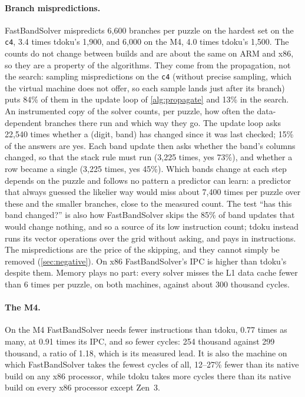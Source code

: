 \documentclass[11pt]{article}
\theoremstyle{definition}
\theoremstyle{plain}
\begin{document}
\paragraph{Branch mispredictions.} FastBandSolver mispredicts 6{,}600 branches per puzzle on the hardest set on the
\texttt{c4}, 3.4 times tdoku's 1{,}900, and 6{,}000 on the M4, 4.0 times tdoku's 1{,}500. The counts do not change
between builds and are about the same on ARM and x86, so they are a property of the algorithms. They come from the
propagation, not the search: sampling mispredictions on the \texttt{c4} (without precise sampling, which the virtual
machine does not offer, so each sample lands just after its branch) puts 84\% of them in the update loop of
\cref{alg:propagate} and 13\% in the search. An instrumented copy of the solver counts, per puzzle, how often the
data-dependent branches there run and which way they go. The update loop asks 22{,}540 times whether a (digit, band)
has changed since it was last checked; 15\% of the answers are yes. Each band update then asks whether the band's
columns changed, so that the stack rule must run (3{,}225 times, yes 73\%), and whether a row became a single (3{,}225
times, yes 45\%). Which bands change at each step depends on the puzzle and follows no pattern a predictor can learn:
a predictor that always guessed the likelier way would miss about 7{,}400 times per puzzle over these and the smaller
branches, close to the measured count. The test ``has this band changed?'' is also how FastBandSolver skips the 85\%
of band updates that would change nothing, and so a source of its low instruction count; tdoku instead runs its vector
operations over the grid without asking, and pays in instructions. The mispredictions are the price of the skipping,
and they cannot simply be removed (\cref{sec:negative}). On x86 FastBandSolver's IPC is higher than tdoku's
despite them. Memory plays no part: every solver misses the L1 data cache fewer than 6 times per puzzle, on both
machines, against about 300 thousand cycles.

\paragraph{The M4.} On the M4 FastBandSolver needs fewer instructions than tdoku, 0.77 times as many, at 0.91 times its
IPC, and so fewer cycles: 254 thousand against 299 thousand, a ratio of 1.18, which is its measured lead. It is also the
machine on which FastBandSolver takes the fewest cycles of all, 12--27\% fewer than its native build on any x86
processor, while tdoku takes more cycles there than its native build on every x86 processor except Zen~3.
\end{document}
